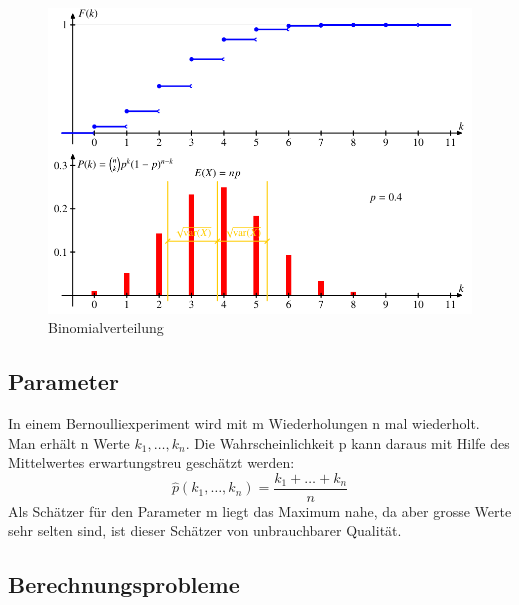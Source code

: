 \documentclass[../Main.tex]{subfiles}
\begin{document}
\begin{figure}[H]
    \centering
    \includegraphics[width=0.75\linewidth]{Images/binomial-verteilung.png}
    \caption{Binomialverteilung}
\end{figure}


\subsection{Parameter}
In einem Bernoulliexperiment wird mit m Wiederholungen n mal wiederholt. Man erhält n Werte
 \(k_1,\dots, k_n\). Die Wahrscheinlichkeit p kann daraus mit Hilfe des Mittelwertes erwartungstreu
 geschätzt werden:
\begin{equation}
    \hat{p}(k_1,\dots , k_n) = \frac{k_1 + \dots + k_n}{n}
\end{equation}
Als Schätzer für den Parameter m liegt das Maximum nahe, da aber grosse Werte sehr selten
sind, ist dieser Schätzer von unbrauchbarer Qualität.

\subsection{Berechnungsprobleme}
\end{document}
